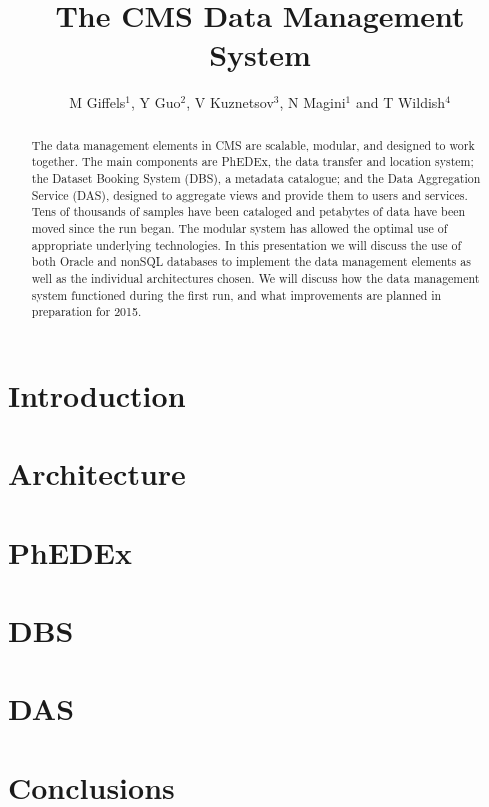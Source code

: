 \documentclass[a4paper]{jpconf}
\begin{document}
\title{The CMS Data Management System}

\author{M Giffels$^1$, Y Guo$^2$, V Kuznetsov$^3$,
        N Magini$^1$ and T Wildish$^4$}

\address{$^1$ CERN, CH-1211 Gen\`eve 23, Switzerland }
\address{$^2$ Fermi National Accelerator Laboratory, Batavia, Il, USA }
\address{$^3$ Cornell University, Ithaca, NY, USA }
\address{$^4$ Princeton University, Princeton, NJ, USA }


\begin{abstract}
The data management elements in CMS are scalable, modular, and designed to work together. The main components are PhEDEx, the data transfer and location system; the Dataset Booking System (DBS), a metadata catalogue; and the Data Aggregation Service (DAS), designed to aggregate views and provide them to users and services. Tens of thousands of samples have been cataloged and petabytes of data have been moved since the run began. The modular system has allowed the optimal use of appropriate underlying technologies. In this presentation we will discuss the use of both Oracle and nonSQL databases to implement the data management elements as well as the individual architectures chosen. We will discuss how the data management system functioned during the first run, and what improvements are planned in preparation for 2015.
\end{abstract}

\section{Introduction}


\section{Architecture}


\section{PhEDEx}


\section{DBS}


\section{DAS}


\section{Conclusions}


\par

\end{document}
